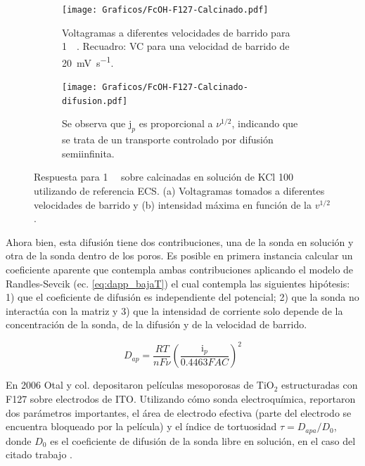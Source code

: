 	 	\begin{figure}[h!]
				 \begin{subfigure}[t]{0.5\textwidth}
		 	    \texttt{[image: Graficos/FcOH-F127-Calcinado.pdf]}
		        \caption[Voltagrama para \fc\space en \pdm\space calcinadas]{Voltagramas a diferentes velocidades de barrido para \fc\space \SI{1}{\milli\Molar}. Recuadro: VC para una velocidad de barrido de \SI{20}{\milli\volt\per\second}.}
		        \label{fig:fc_calcinado}
		      	\end{subfigure}
		      	  \begin{subfigure}[t]{0.5\textwidth}
		 	    \texttt{[image: Graficos/FcOH-F127-Calcinado-difusion.pdf]}
		        \caption[i$_p$ en función de $\nu$ para \fc\space]{Se observa que $\text{j}_p$ es proporcional a $\nu ^{1/2}$, indicando que se trata de un transporte controlado por difusión semiinfinita.}
		        \label{fig:difusion_calcinado}
		      	\end{subfigure}
		      	\caption{Respuesta para \fc\space \SI{1}{\milli\Molar} sobre \pdmF\space calcinadas en solución de KCl \SI{100}{\milli\Molar} utilizando de referencia ECS. (a) Voltagramas tomados a diferentes velocidades de barrido y (b) intensidad máxima en función de la $v^{1/2}$.}
		      	\end{figure}

	 Ahora bien, esta difusión tiene dos contribuciones, una de la sonda en solución y otra de la sonda dentro de los poros. Es posible en primera instancia calcular un coeficiente aparente que contempla ambas contribuciones aplicando el modelo de Randles-Sevcik (ec. \ref{eq:dapp_bajaT}) el cual contempla las siguientes hipótesis: 1) que el coeficiente de difusión es independiente del potencial; 2) que la sonda no interactúa con la matriz y 3) que la intensidad de corriente solo depende de la concentración de la sonda, de la difusión y de la velocidad de 	barrido.  	

	 	 \begin{equation}
					D_{ap}=\frac{RT}{nF\nu}\left(\frac{\text{i}_p}{0.4463FAC}\right)^2
					\label{eq:dapp_bajaT}
			\end{equation}  

	 En 2006 Otal y col. \cite{Otal2006} depositaron películas mesoporosas de TiO$_2$ estructuradas con F127 sobre electrodos de ITO. Utilizando \fe\space cómo sonda electroquímica, reportaron dos parámetros importantes, el área de electrodo efectiva (parte del electrodo se encuentra bloqueado por la película) y el índice de tortuosidad $\tau=D_{apa}/D_0$, donde $D_0$ es el coeficiente de difusión de la sonda libre en solución, en el caso del citado trabajo \fe. 
	 
